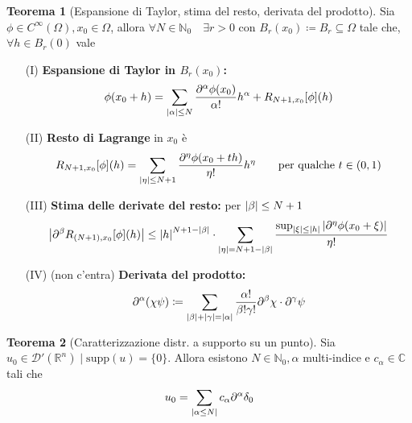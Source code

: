 \documentclass[a4paper,10pt]{article}
\theoremstyle{definition}
\newcommand{\na}{\mathbb{N}} %
\newcommand{\re}{\mathbb{R}} %
\newcommand{\im}{\mathbb{C}} %
\newcommand{\supp}{\text{supp}} %
\theoremstyle{indentdefinition}
\theoremstyle{indenttheorem}
\newtheorem{thm}{Teorema}
\theoremstyle{myremark}
\theoremstyle{indentgeneral}
\newenvironment{myboxed} 
{\noindent\begin{lrbox}{\mybox}\begin{minipage}{\textwidth}}
{\end{minipage}\end{lrbox}\fbox{\usebox{\mybox}}}
\begin{document}
\begin{myboxed}
\begin{thm}[Espansione di Taylor, stima del resto, derivata del prodotto]
    Sia $\phi\in C^\infty(\Omega), x_0\in \Omega$, allora $\forall N\in \na_0\quad \exists r>0$ con $B_r(x_0)\coloneqq B_r\subseteq\Omega$ tale che, $\forall h\in B_r(0)$ vale
    \begin{enumerate}
        \item[(I)] \textbf{Espansione di Taylor in $B_r(x_0)$:}
        $$\phi(x_0+h)=\sum_{\abs{\alpha}\le N}\frac{\partial^\alpha\phi(x_0)}{\alpha!}h^\alpha+R_{N+1,x_0}[\phi](h)$$
        \item[(II)] \textbf{Resto di Lagrange} in $x_0$ è
        $$R_{N+1,x_0}[\phi](h)=\sum_{\abs{\eta}\le N+1}\frac{\partial^\eta\phi(x_0+th)}{\eta!}h^\eta\qquad \text{per qualche }t\in (0,1)$$
        \item[(III)] \textbf{Stima delle derivate del resto:} per  $\abs{\beta}\le N+1$
        $$\abs{\partial^\beta R_{(N+1),x_0}[\phi](h)}\le \abs{h}^{N+1-\abs{\beta}}\cdot\sum_{\abs{\eta}=N+1-\abs{\beta}}\frac{\sup_{\abs{\xi}\le\abs{h}}\abs{\partial^\eta\phi(x_0+\xi)}}{\eta!}$$
        \item[(IV)] (non c'entra) \textbf{Derivata del prodotto:}
        $$\partial^\alpha(\chi\psi)\coloneqq\sum_{\abs{\beta}+\abs{\gamma}=\abs{\alpha}}\frac{\alpha!}{\beta!\gamma!}\partial^\beta\chi\cdot\partial^\gamma\psi$$
    \end{enumerate}
\end{thm}
\end{myboxed}

\begin{myboxed}
    \begin{thm}[Caratterizzazione distr. a supporto su un punto] Sia $u_0\in \mathcal{D}'(\re^n)\mid \supp(u)=\{0\}$. Allora esistono $N\in \na_0,\alpha$ multi-indice e $c_\alpha\in\im$ tali che
    $$u_0=\sum_{\abs{\alpha\le N}}c_\alpha\partial^\alpha\delta_0$$     
    \end{thm}
\end{myboxed}
\end{document}
